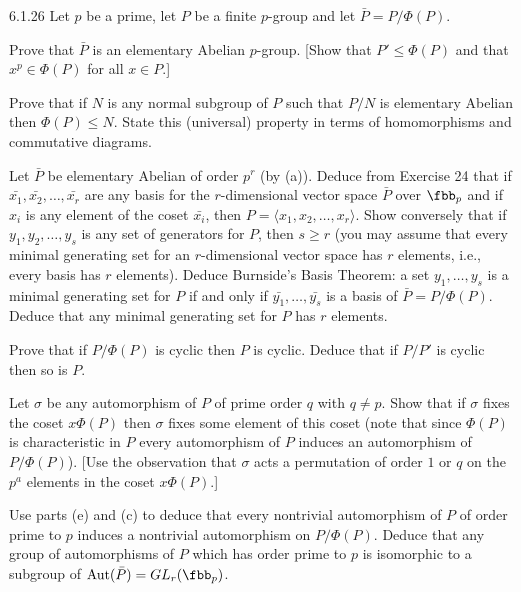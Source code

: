 \begin{exercise}{6.1.26}
    Let $p$ be a prime, let $P$ be a finite $p$-group and let $\bar{P} = P/\Phi(P)$.
    \begin{subexercises}
        \item Prove that $\bar{P}$ is an elementary Abelian $p$-group.
        [Show that $P' \leq \Phi(P)$ and that $x^p \in \Phi(P)$ for all $x \in P$.]
        \item Prove that if $N$ is any normal subgroup of $P$ such that $P/N$ is elementary Abelian then $\Phi(P) \leq N$.
        State this (universal) property in terms of homomorphisms and commutative diagrams.
        \item Let $\bar{P}$ be elementary Abelian of order $p^r$ (by (a)).
        Deduce from Exercise 24 that if $\bar{x_1}, \bar{x_2}, \ldots, \bar{x_r}$ are any basis for the $r$-dimensional vector space $\bar{P}$ over $\fbb_p$ and if $x_i$ is any element of the coset $\bar{x_i}$, then $P = \langle x_1, x_2, \ldots, x_r \rangle$.
        Show conversely that if $y_1, y_2, \ldots, y_s$ is any set of generators for $P$, then $s \geq r$ (you may assume that every minimal generating set for an $r$-dimensional vector space has $r$ elements, i.e., every basis has $r$ elements).
        Deduce Burnside's Basis Theorem: a set $y_1, \ldots, y_s$ is a minimal generating set for $P$ if and only if $\bar{y_1}, \ldots, \bar{y_s}$ is a basis of $\bar{P} = P/\Phi(P)$.
        Deduce that any minimal generating set for $P$ has $r$ elements.
        \item Prove that if $P/\Phi(P)$ is cyclic then $P$ is cyclic.
        Deduce that if $P/P'$ is cyclic then so is $P$.
        \item Let $\sigma$ be any automorphism of $P$ of prime order $q$ with $q \neq p$.
        Show that if $\sigma$ fixes the coset $x\Phi(P)$ then $\sigma$ fixes some element of this coset (note that since $\Phi(P)$ is characteristic in $P$ every automorphism of $P$ induces an automorphism of $P/\Phi(P)$).
        [Use the observation that $\sigma$ acts a permutation of order $1$ or $q$ on the $p^a$ elements in the coset $x\Phi(P)$.]
        \item Use parts (e) and (c) to deduce that every nontrivial automorphism of $P$ of order prime to $p$ induces a nontrivial automorphism on $P/\Phi(P)$.
        Deduce that any group of automorphisms of $P$ which has order prime to $p$ is isomorphic to a subgroup of $\mathrm{Aut}(\bar{P}) = GL_r(\fbb_p)$.
    \end{subexercises}
\end{exercise}

